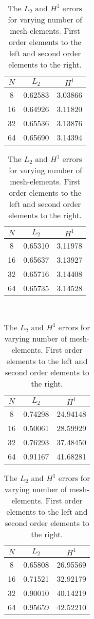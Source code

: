 \documentclass[]{article}
\begin{document}
\begin{table}[htpb]
    \centering

    \caption{The $L_2$ and $H^1$ errors for varying number of mesh-elements.
    First order elements to the left and second order elements to the right.}

    \label{tbl:errors_1}

    \begin{tabular}{ccc}
        \toprule
        $N$  & $L_2$ & $H^1$\\
        \midrule
        8	& 0.62583&	 3.03866 \\
        16	& 0.64926&	 3.11820 \\
        32	& 0.65536&	 3.13876 \\
        64	& 0.65690&	 3.14394 \\
        \bottomrule
    \end{tabular}\hspace{4em}
    \begin{tabular}{ccc}
        \toprule
        $N$  & $L_2$ & $H^1$\\
        \midrule
        8	&0.65310	&3.11978\\
        16	&0.65637	&3.13927\\
        32	&0.65716	&3.14408\\
        64	&0.65735	&3.14528\\
        \bottomrule
    \end{tabular}\\[2em]


    \begin{tabular}{ccc}
        \toprule
        $N$  & $L_2$ & $H^1$\\
        \midrule
        8	 &0.74298	 &24.94148\\
        16	 &0.50061	 &28.59929\\
        32	 &0.76293	 &37.48450\\
        64	 &0.91167	 &41.68281\\
        \bottomrule
    \end{tabular}\hspace{4em}
    \begin{tabular}{ccc}
        \toprule
        $N$  & $L_2$ & $H^1$\\
        \midrule
        8	&0.65808	&26.95569\\
        16	&0.71521	&32.92179\\
        32	&0.90010	&40.14219\\
        64	&0.95659	&42.52210\\
        \bottomrule
    \end{tabular}

\end{table}
\end{document}
